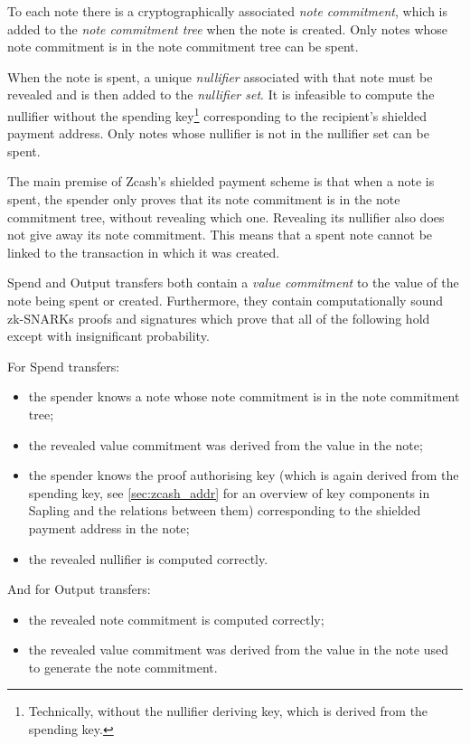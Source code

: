To each note there is a cryptographically associated \emph{note commitment}, which is added to the \emph{note commitment tree} when the note is created.
Only notes whose note commitment is in the note commitment tree can be spent.

When the note is spent, a unique \emph{nullifier} associated with that note must be revealed and is then added to the \emph{nullifier set}.
It is infeasible to compute the nullifier without the spending key\footnote{Technically, without the nullifier deriving key, which is derived from the spending key.} corresponding to the recipient's shielded payment address.
Only notes whose nullifier is not in the nullifier set can be spent.

The main premise of Zcash's shielded payment scheme is that when a note is spent, the spender only proves that its note commitment is in the note commitment tree, without revealing which one.
Revealing its nullifier also does not give away its note commitment.
This means that a spent note cannot be linked to the transaction in which it was created.

Spend and Output transfers both contain a \emph{value commitment} to the value of the note being spent or created.
Furthermore, they contain computationally sound zk-SNARKs proofs and signatures which prove that all of the following hold except with insignificant probability.

For Spend transfers:
\begin{itemize}
    \item the spender knows a note whose note commitment is in the note commitment tree;
    \item the revealed value commitment was derived from the value in the note;
    \item the spender knows the proof authorising key (which is again derived from the spending key, see \cref{sec:zcash_addr} for an overview of key components in Sapling and the relations between them) corresponding to the shielded payment address in the note;
    \item the revealed nullifier is computed correctly.
\end{itemize}

And for Output transfers:
\begin{itemize}
    \item the revealed note commitment is computed correctly;
    \item the revealed value commitment was derived from the value in the note used to generate the note commitment.
\end{itemize}

